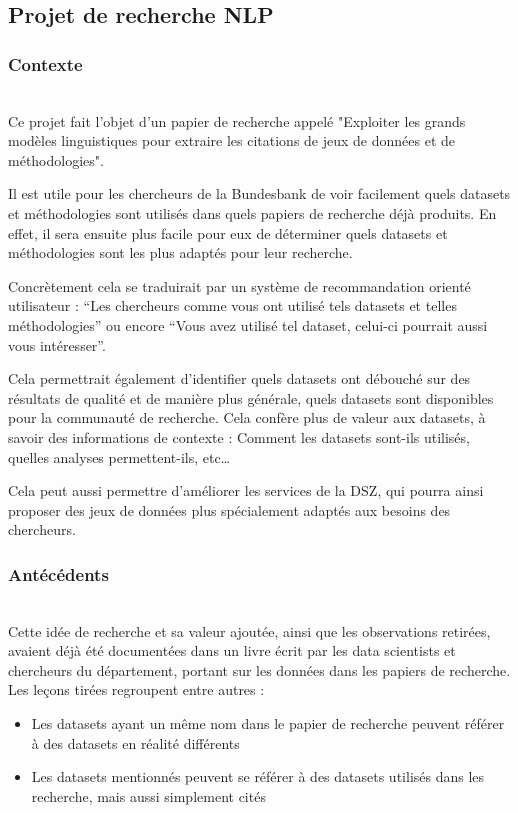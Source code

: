 \pagebreak

\subsection{Projet de recherche NLP}

\subsubsection{Contexte}
~\\
Ce projet fait l'objet d'un papier de recherche appelé "Exploiter les grands modèles linguistiques pour extraire les citations de jeux de données et de méthodologies".

Il est utile pour les chercheurs de la Bundesbank de voir facilement quels datasets et méthodologies sont utilisés dans quels papiers de recherche déjà produits. 
En effet, il sera ensuite plus facile pour eux de déterminer quels datasets et méthodologies sont les plus adaptés pour leur recherche. 

Concrètement cela se traduirait par un système de recommandation orienté utilisateur : “Les chercheurs comme vous ont utilisé tels datasets et telles méthodologies” ou encore “Vous avez utilisé tel dataset, celui-ci pourrait aussi vous intéresser”. 

Cela permettrait également d'identifier quels datasets ont débouché sur des résultats de qualité et de manière plus générale, quels datasets sont disponibles pour la communauté de recherche.
Cela confère plus de valeur aux datasets, à savoir des informations de contexte : Comment les datasets sont-ils utilisés, quelles analyses permettent-ils, etc… 

Cela peut aussi permettre d'améliorer les services de la DSZ, qui pourra ainsi proposer des jeux de données plus spécialement adaptés aux besoins des chercheurs.


\subsubsection{Antécédents}
~\\
Cette idée de recherche et sa valeur ajoutée, ainsi que les observations retirées, avaient déjà été documentées dans un livre écrit par les data scientists et chercheurs du département, portant sur les données dans les papiers de recherche.
Les leçons tirées regroupent entre autres : 

\begin{itemize}
    \item Les datasets ayant un même nom dans le papier de recherche peuvent référer à des datasets en réalité différents
    \item Les datasets mentionnés peuvent se référer à des datasets utilisés dans les recherche, mais aussi simplement cités
\end{itemize}


